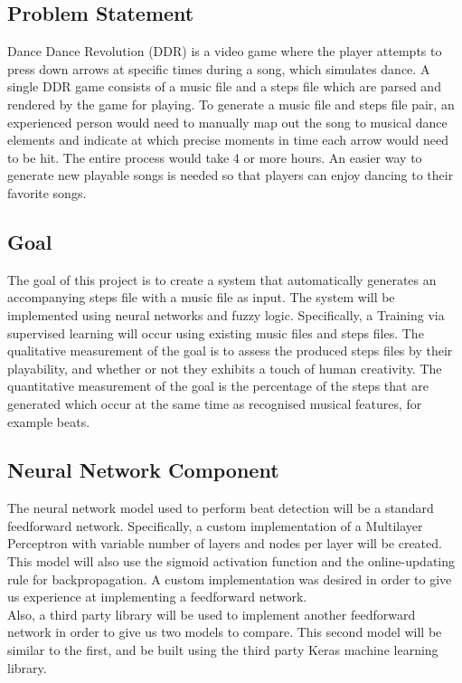 \subsection{Problem Statement}
Dance Dance Revolution (DDR) is a video game where the player attempts to press down arrows at specific times during a song, which simulates dance. A single DDR game consists of a music file and a steps file which are parsed and rendered by the game for playing. To generate a music file and steps file pair, an experienced person would need to manually map out the song to musical dance elements and indicate at which precise moments in time each arrow would need to be hit. The entire process would take 4 or more hours. An easier way to generate new playable songs is needed so that players can enjoy dancing to their favorite songs.\\

\subsection{Goal}
The goal of this project is to create a system that automatically generates an accompanying steps file with a music file as input. The system will be implemented using neural networks and fuzzy logic. Specifically, a  Training via supervised learning will occur using existing music files and steps files. The qualitative measurement of the goal is to assess the produced steps files by their playability, and whether or not they exhibits a touch of human creativity. The quantitative measurement of the goal is the percentage of the steps that are generated which occur at the same time as recognised musical features, for example beats.\\

\subsection{Neural Network Component}

The neural network model used to perform beat detection will be a standard feedforward network. Specifically, a custom implementation of a Multilayer Perceptron with variable number of layers and nodes per layer will be created. This model will also use the sigmoid activation function and the online-updating rule for backpropagation. A custom implementation was desired in order to give us experience at implementing a feedforward network.\\

Also, a third party library will be used to implement another feedforward network in order to give us two models to compare. This second model will be similar to the first, and be built using the third party Keras machine learning library.